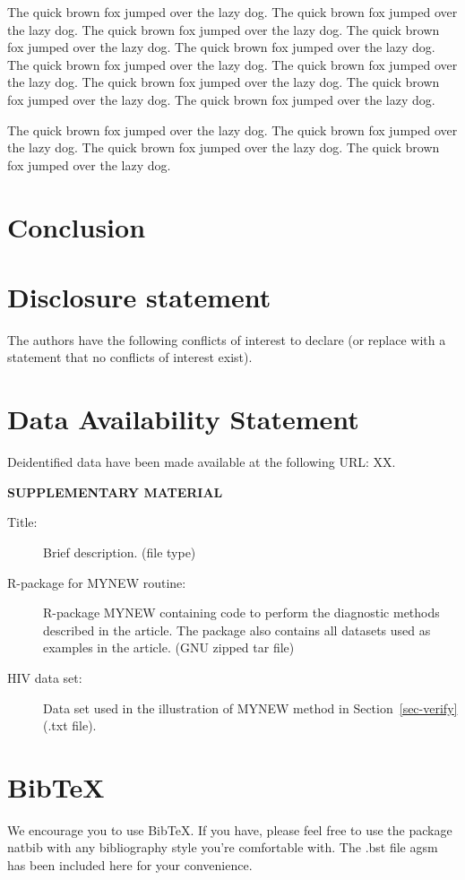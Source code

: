 \documentclass[
  12pt]{article}
\begin{document}
The quick brown fox jumped over the lazy dog. The quick brown fox jumped
over the lazy dog. The quick brown fox jumped over the lazy dog. The
quick brown fox jumped over the lazy dog. The quick brown fox jumped
over the lazy dog. The quick brown fox jumped over the lazy dog. The
quick brown fox jumped over the lazy dog. The quick brown fox jumped
over the lazy dog. The quick brown fox jumped over the lazy dog. The
quick brown fox jumped over the lazy dog.

The quick brown fox jumped over the lazy dog. The quick brown fox jumped
over the lazy dog. The quick brown fox jumped over the lazy dog. The
quick brown fox jumped over the lazy dog.

\addtolength{\textheight}{-.2in}%

\hypertarget{sec-conc}{%
\section{Conclusion}\label{sec-conc}}

\hypertarget{disclosure-statement}{%
\section{Disclosure statement}\label{disclosure-statement}}

The authors have the following conflicts of interest to declare (or
replace with a statement that no conflicts of interest exist).

\hypertarget{data-availability-statement}{%
\section{Data Availability
Statement}\label{data-availability-statement}}

Deidentified data have been made available at the following URL: XX.

\hypertarget{supplementary-material}{}
\bigskip

\begin{center}

{\large\bf SUPPLEMENTARY MATERIAL}

\end{center}

\begin{description}
\item[Title:]
Brief description. (file type)
\item[R-package for MYNEW routine:]
R-package MYNEW containing code to perform the diagnostic methods
described in the article. The package also contains all datasets used as
examples in the article. (GNU zipped tar file)
\item[HIV data set:]
Data set used in the illustration of MYNEW method in
Section~\ref{sec-verify} (.txt file).
\end{description}

\hypertarget{bibtex}{%
\section{BibTeX}\label{bibtex}}

We encourage you to use BibTeX. If you have, please feel free to use the
package natbib with any bibliography style you're comfortable with. The
.bst file agsm has been included here for your convenience.


  
\end{document}
